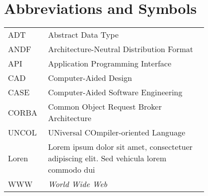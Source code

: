 \chapter*{Abbreviations and Symbols}

\begin{flushleft}
\begin{tabular}{l p{0.8\linewidth}}
ADT      & Abstract Data Type\\
ANDF     & Architecture-Neutral Distribution Format\\
API      & Application Programming Interface\\
CAD      & Computer-Aided Design\\
CASE     & Computer-Aided Software Engineering\\
CORBA    & Common Object Request Broker Architecture\\
UNCOL    & UNiversal COmpiler-oriented Language\\
Loren    & Lorem ipsum dolor sit amet, consectetuer adipiscing
elit. Sed vehicula lorem commodo dui\\
WWW      & \emph{World Wide Web}
\end{tabular}
\end{flushleft}


